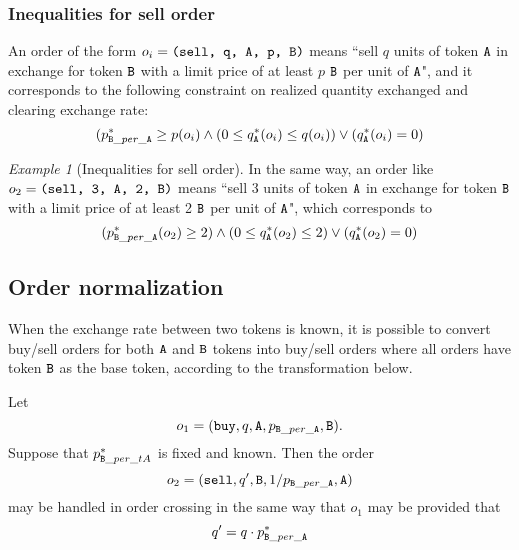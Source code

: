 \documentclass[11pt, reqno]{amsart}
\theoremstyle{definition}
\theoremstyle{remark}
\newtheorem{exmp}{Example}[subsection]
\newcommand{\tA}{\textnormal{\texttt{A}}}
\newcommand{\tB}{\textnormal{\texttt{B}}}
\newcommand{\buy}{\textnormal{\texttt{buy}}}
\newcommand{\sell}{\textnormal{\texttt{sell}}}
\begin{document}
\subsubsection{Inequalities for sell order}
An order of the form $o_i = \texttt{(\sell, q, \tA, p, \tB)}$ means
``sell $q$ units of token $\tA$ in exchange for token $\tB$ with a limit price
of at least $p$ $\tB$ per unit of $\tA$",
and it corresponds to the following constraint on realized quantity exchanged
and clearing exchange rate:
\begin{equation*}
	(p_{\tB\_per\_\tA}^* \geq p(o_i) \land
	(0 \le q_\tA^*(o_i) \leq q(o_i)) \lor
	(q_\tA^*(o_i) = 0)
\end{equation*}

\begin{exmp}[Inequalities for sell order]
In the same way, an order like $o_2 = \texttt{(sell, 3, \tA, 2, \tB)}$ means
``sell 3 units of token $\tA$ in exchange for token $\tB$ with a limit price of
at least 2 $\tB$ per unit of $\tA$", which corresponds to
\begin{equation*}
    (p_{\tB\_per\_\tA}^*(o_2) \geq 2) \land
    (0 \le q_\tA^*(o_2) \leq 2) \lor
    (q_\tA^*(o_2) = 0)
\end{equation*}
\end{exmp}

\subsection{Order normalization}
When the exchange rate between two tokens is known, it is possible to convert
buy/sell orders for both $\tA$ and $\tB$ tokens into buy/sell orders where all
orders have token $\tB$ as the base token, according to the transformation below.

Let
\[
	o_1 = (\buy, q, \tA, p_{\tB\_per\_\tA}, \tB).
\]
Suppose that $p^*_{\tB\_per\_tA}$ is fixed and known. Then the order
\[
	o_2 = (\sell, q^\prime, \tB, 1 / p_{\tB\_per\_\tA}, \tA)
\]
may be handled in order crossing in the same way that $o_1$ may be
provided that
\[
	q^\prime = q \cdot p^*_{\tB\_per\_\tA}
\]

%
%
%
\end{document}
